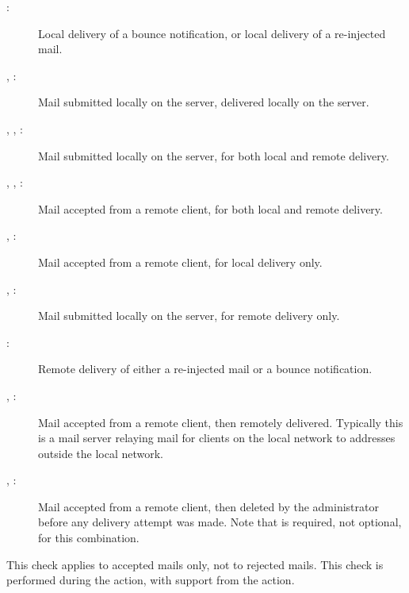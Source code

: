 \begin{description}

    \item [:] Local delivery of a bounce notification, or
        local delivery of a re-injected mail.

    \item [, :] Mail submitted locally on the
        server, delivered locally on the server.

    \item [, , :] Mail submitted
        locally \newline{} on the server, for both local and remote
        delivery.

    \item [, , :] Mail accepted
        from a remote client, for both local and remote delivery.

    \item [, :] Mail accepted from a remote
        client, for local delivery only.

    \item [, :] Mail submitted locally on the
        server, for remote delivery only.

    \item [:] Remote delivery of either a re-injected mail or
        a bounce notification.

    \item [, :] Mail accepted from a remote
        client, then remotely delivered.  Typically this is a mail server
        relaying mail for clients on the local network to addresses outside
        the local network.

    \item [, :] Mail accepted from a remote
        client, then deleted by the administrator before any delivery
        attempt was made.  Note that  is required, not
        optional, for this combination.

\end{description}

This check applies to accepted mails only, not to rejected mails.  This
check is performed during the  action, with support from the
 action.


